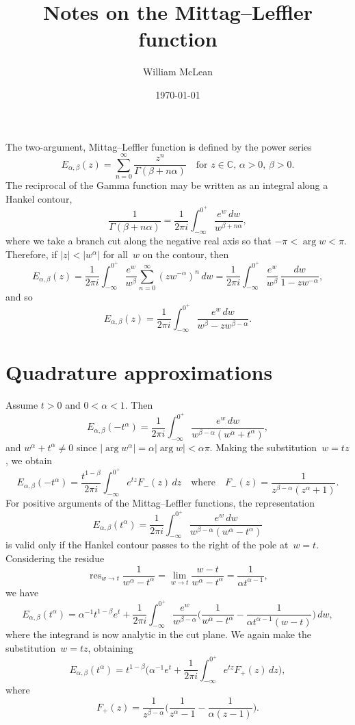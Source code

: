 \documentclass[12pt,a4paper]{article}
\title{Notes on the Mittag--Leffler function}
\author{William McLean}
\date{\today}
\DeclareMathOperator*{\res}{res}
\begin{document}
\maketitle
The two-argument, Mittag--Leffler function is defined by the power series
\[
E_{\alpha,\beta}(z)=\sum_{n=0}^\infty\frac{z^n}{\Gamma(\beta+n\alpha)}
\quad\text{for $z\in\mathbb{C}$, $\alpha>0$, $\beta>0$.}
\]
The reciprocal of the Gamma function may be written as an integral along a
Hankel contour,
\[
\frac{1}{\Gamma(\beta+n\alpha)}=\frac{1}{2\pi i}\int_{-\infty}^{0^+}
    \frac{e^w\,dw}{w^{\beta+n\alpha}},
\]
where we take a branch cut along the negative real axis so that 
$-\pi<\arg w<\pi$. Therefore, if $|z|<|w^\alpha|$ for all~$w$ on the contour, 
then
\[
E_{\alpha,\beta}(z)=\frac{1}{2\pi i}\int_{-\infty}^{0^+}\frac{e^w}{w^\beta}
    \sum_{n=0}^\infty(zw^{-\alpha})^n\,dw
    =\frac{1}{2\pi i}\int_{-\infty}^{0^+}\frac{e^w}{w^\beta}\,
    \frac{dw}{1-zw^{-\alpha}},
\]
and so
\begin{equation}\label{eq: integral repn}
E_{\alpha,\beta}(z)=\frac{1}{2\pi i}\int_{-\infty}^{0^+}
    \frac{e^w\,dw}{w^\beta-zw^{\beta-\alpha}}.
\end{equation}
\section{Quadrature approximations}
Assume $t>0$ and $0<\alpha<1$.  Then
\[
E_{\alpha,\beta}(-t^\alpha)=\frac{1}{2\pi i}\int_{-\infty}^{0^+}
    \frac{e^w\,dw}{w^{\beta-\alpha}(w^\alpha+t^\alpha)},
\]
and $w^\alpha+t^\alpha\ne0$ since $|\arg w^\alpha|=\alpha|\arg w|<\alpha\pi$.  
Making the substitution~$w=tz$, we obtain
\[
E_{\alpha,\beta}(-t^\alpha)=\frac{t^{1-\beta}}{2\pi i}\int_{-\infty}^{0^+}
    e^{tz}F_-(z)\,dz
\quad\text{where}\quad F_-(z)=\frac{1}{z^{\beta-\alpha}(z^\alpha+1)}.
\]
For positive arguments of the Mittag--Leffler functions, the representation
\[
E_{\alpha,\beta}(t^\alpha)=\frac{1}{2\pi i}\int_{-\infty}^{0^+}
    \frac{e^w\,dw}{w^{\beta-\alpha}(w^\alpha-t^\alpha)}
\]
is valid only if the Hankel contour passes to the right of the pole 
at~$w=t$.  Considering the residue
\[
\res_{w\to t}\frac{1}{w^\alpha-t^\alpha}
    =\lim_{w\to t}\frac{w-t}{w^\alpha-t^\alpha}
    =\frac{1}{\alpha t^{\alpha-1}},
\]
we have
\[
E_{\alpha,\beta}(t^\alpha)=\alpha^{-1}t^{1-\beta}e^t
    +\frac{1}{2\pi i}\int_{-\infty}^{0^+}\frac{e^w}{w^{\beta-\alpha}}
    \biggl(\frac{1}{w^\alpha-t^\alpha}
    -\frac{1}{\alpha t^{\alpha-1}(w-t)}\biggr)\,dw,
\]
where the integrand is now analytic in the cut plane.  We again make the 
substitution~$w=tz$, obtaining
\[
E_{\alpha,\beta}(t^\alpha)=t^{1-\beta}\biggl(\alpha^{-1}e^t
    +\frac{1}{2\pi i}\int_{-\infty}^{0^+}e^{tz}F_+(z)\,dz\biggr),
\]
where
\[
F_+(z)=\frac{1}{z^{\beta-\alpha}}\biggl(\frac{1}{z^\alpha-1}
    -\frac{1}{\alpha(z-1)}\biggr).
\]
\end{document}
